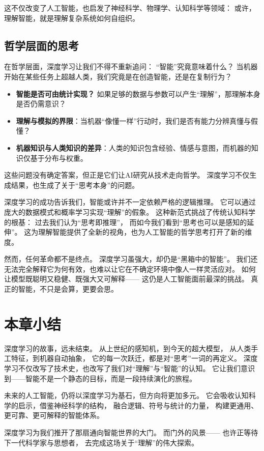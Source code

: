 这不仅改变了人工智能，也启发了神经科学、物理学、认知科学等领域：  
或许，理解智能，就是理解复杂系统如何自组织。

\subsection{哲学层面的思考}

在哲学层面，深度学习让我们不得不重新追问：  
“智能”究竟意味着什么？  
当机器开始在某些任务上超越人类，我们究竟是在创造智能，还是在复制行为？  

\begin{itemize}
\item \textbf{智能是否可由统计实现？}  
如果足够的数据与参数可以产生“理解”，那理解本身是否仍需意识？
\item \textbf{理解与模拟的界限}：当机器“像懂一样”行动时，我们是否有能力分辨真懂与假懂？
\item \textbf{机器知识与人类知识的差异}：人类的知识包含经验、情感与意图，而机器的知识仅基于分布与权重。
\end{itemize}

这些问题没有确定答案，但正是它们让AI研究从技术走向哲学。  
深度学习不仅生成结果，也生成了关于“思考本身”的问题。

深度学习的成功告诉我们，智能或许并不一定依赖严格的逻辑推理。  
它可以通过庞大的数据模式和概率学习实现“理解”的假象。  
这种新范式挑战了传统认知科学的根基：  
过去我们认为“思考即推理”，  
而如今我们看到“思考也可以是感知的延伸”。  
这为理解智能提供了全新的视角，也为人工智能的哲学思考打开了新的维度。

然而，任何革命都不是终点。  
深度学习虽强大，却仍是“黑箱中的智能”。  
我们还无法完全解释它为何有效，也难以让它在不确定环境中像人一样灵活应对。  
如何让模型既聪明又稳健、既强大又可解释——  
这仍是人工智能面前最深的挑战。  
真正的智能，不只是会算，更要会思。

\section{本章小结}

深度学习的故事，远未结束。  
从上世纪的感知机，到今天的超大模型，  
从人类手工特征，到机器自动抽象，  
它的每一次跃迁，都是对“思考”一词的再定义。  
深度学习不仅改写了技术史，也改写了我们对“理解”与“智能”的认知。  
它让我们意识到——智能不是一个静态的目标，而是一段持续演化的旅程。

未来的人工智能，仍将以深度学习为基石，但方向将更加多元。  
它会吸收认知科学的启示，借鉴神经科学的结构，  
融合逻辑、符号与统计的力量，  
构建更通用、更可靠、更可解释的智能体系。  

深度学习为我们推开了那扇通向智能世界的大门。  
而门外的风景——  
也许正等待下一代科学家与思想者，  
去完成这场关于“理解”的伟大探索。


